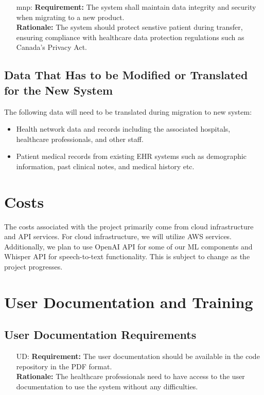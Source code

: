 \documentclass[12pt]{article}
\newcounter{udnum} %
\newcounter{mnpnum} %
\begin{document}
\begin{itemize}
\begin{itemize}
\begin{itemize}
  \item [mnp\refstepcounter{mnpnum}\themnpnum \label{MNP_security}:] 
  \textbf{Requirement:} The system shall maintain data integrity and security when migrating to a new product.\\
  \textbf{Rationale:} The system should protect senstive patient during transfer, ensuring compliance with healthcare data protection regulations such as Canada's Privacy Act.\\
\end{itemize}

\subsection{Data That Has to be Modified or Translated for the New System}
The following data will need to be translated during migration to new system: 
\begin{itemize}
  \item Health network data and records including the associated hospitals, healthcare professionals, and other staff. 
  \item Patient medical records from existing EHR systems such as demographic information, past clinical notes, and medical history etc.
\end{itemize}

\section{Costs}
The costs associated with the project primarily come from cloud infrastructure and API services. For cloud infrastructure, we will utilize AWS services. Additionally, we plan to use OpenAI API for some of our ML components and Whisper API for speech-to-text functionality. This is subject to change as the project progresses. 

\section{User Documentation and Training}
\subsection{User Documentation Requirements}
\begin{itemize}
  \item [UD\refstepcounter{udnum}\theudnum \label{UD_doc1}:] 
  \textbf{Requirement:} The user documentation should be available in the code repository in the PDF format.\\
  \textbf{Rationale:} The healthcare professionals need to have access to the user documentation to use the system without any difficulties.\\


\end{itemize}
\end{itemize}
\end{itemize}
\end{document}
